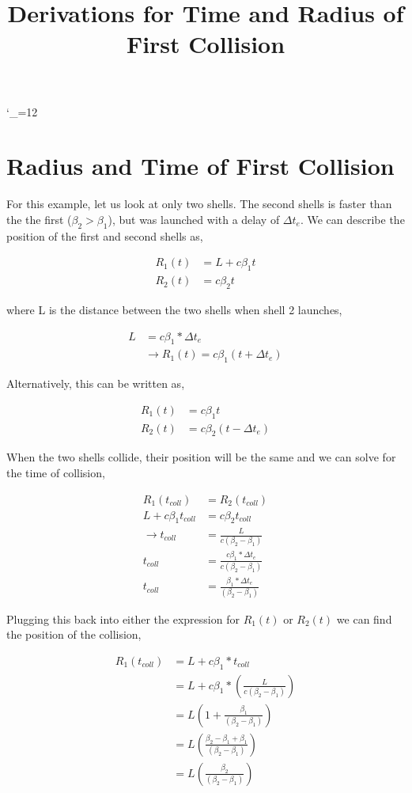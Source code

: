 \documentclass[10pt]{article}
\title{Derivations for Time and Radius of First Collision}
\def\upsubscripts{\catcode`\_=12 } \def\normalsubscripts{\catcode`\_=8 }
\begin{document}
\upsubscripts

\section*{Radius and Time of First Collision}

For this example, let us look at only two shells. The second shells is faster than the the first ($\beta_2 > \beta_1$), but was launched with a delay of $\Delta t_e$. We can describe the position of the first and second shells as,

\begin{align}
	R_1(t) &= L + c \beta_1 t \\
	R_2(t) &= c \beta_2 t
\end{align}

where L is the distance between the two shells when shell 2 launches,

\begin{align}
	L &= c\beta_1*\Delta t_e\\
	&\rightarrow R_1(t) = c \beta_1 (t + \Delta t_e)
\end{align}

Alternatively, this can be written as,

\begin{align}
	R_1(t) &= c \beta_1 t \\
	R_2(t) &= c \beta_2 (t-\Delta t_e)
\end{align}

When the two shells collide, their position will be the same and we can solve for the time of collision,

\begin{align}
	R_1(t_{coll}) &= R_2(t_{coll})\\
	L + c\beta_1 t_{coll} &= c \beta_2 t_{coll}\\
	\rightarrow t_{coll} &= \frac{L}{c(\beta_2 - \beta_1)}\\
	t_{coll} &= \frac{c\beta_1*\Delta t_e}{c(\beta_2 - \beta_1)}\\
	t_{coll} &= \frac{\beta_1*\Delta t_e}{(\beta_2 - \beta_1)}
\end{align}

Plugging this back into either the expression for $R_1(t)$ or $R_2(t)$ we can find the position of the collision,

\begin{align}
	R_1(t_{coll}) &= L+c\beta_1*t_{coll}\\
	&= L+c\beta_1*(\frac{L}{c(\beta_2 - \beta_1)})\\
	&= L(1+ \frac{\beta_1}{(\beta_2 - \beta_1)})\\
	&= L(\frac{\beta_2 - \beta_1 + \beta_1}{(\beta_2 - \beta_1)})\\
	&= L(\frac{\beta_2}{(\beta_2 - \beta_1)})
\end{align}
\end{document}
